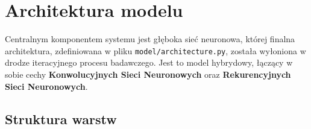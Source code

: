 \section*{Architektura modelu}
\label{sec:tech_model}

Centralnym komponentem systemu jest głęboka sieć neuronowa, której finalna architektura, zdefiniowana w pliku \texttt{model/architecture.py}, została wyłoniona w drodze iteracyjnego procesu badawczego. Jest to model hybrydowy, łączący w sobie cechy \textbf{Konwolucyjnych Sieci Neuronowych} oraz \textbf{Rekurencyjnych Sieci Neuronowych}.

\subsection*{Struktura warstw}

